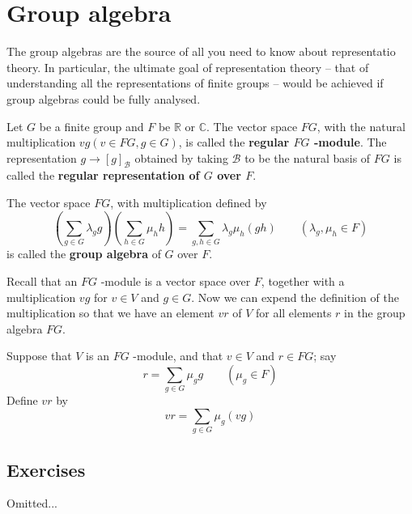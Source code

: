 \section{Group algebra}

The group algebras are the source of all you need to know about representatio theory. In particular, the ultimate goal of representation theory -- that of understanding all the representations of finite groups -- would be achieved if group algebras could be fully analysed.

\begin{definition}[Definition]
Let $G$ be a finite group and $F$ be $\mathbb{R}$ or $\mathbb{C}$. The vector space $F G$, with the natural multiplication $v g(v \in F G, g \in G)$, is called the \textbf{regular $F G$ -module}.
The representation $g \rightarrow[g]_{\mathscr{B}}$ obtained by taking $\mathscr{B}$ to be the natural basis of $F G$ is called the \textbf{regular representation of $G$ over $F$}.
\end{definition}
\begin{definition}
The vector space $FG$, with multiplication defined by
\[
\left( \sum_{g\in G}\lambda_{g}g \right)\left( \sum_{h\in G}\mu_{h}h \right)=\sum_{g,h\in G}\lambda_{g}\mu_{h}(gh)\qquad (\lambda_{g},\mu_{h}\in F)
\]is called the \textbf{group algebra} of $G$ over $F$.
\end{definition}
Recall that an $FG$ -module is a vector space over $F$, together with a multiplication $vg$ for $v\in V$ and $g\in G$. Now we can expend the definition of the multiplication so that we have an element $vr$ of $V$ for all elements $r$ in the group algebra $FG$.

Suppose that $V$ is an $FG$ -module, and that $v\in V$ and $r\in FG$; say
\[
r=\sum_{g\in G}\mu_{g}g\qquad (\mu_{g}\in F)
\]
Define $vr$ by
\[
vr=\sum_{g\in G}\mu_{g}(vg)
\]
\subsection{Exercises}

Omitted...
